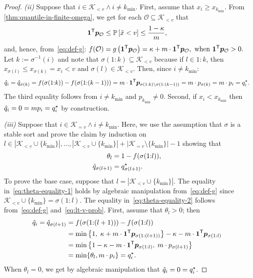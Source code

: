 \begin{proof}
\emph{(ii)} Suppose that $i \in \mathcal{K}_{<v} \wedge i \neq k_{\min}$. First, assume that $x_i \ge x_{k_{\min}}$. From \cref{thm:quantile-in-finite-omega}, we get for each $\mathcal{O} \subseteq \mathcal{K}_{<v}$ that
\begin{equation} \label{eq:lt-v-prob}
 \bm{1}^{\mathsf{T}} \bm{p}_{\mathcal{O}} \le \mathbb{P}\left[ \tilde{x} < v \right] \le \frac{1-\kappa}{m},
\end{equation}
and, hence, from~\eqref{eq:def-g}:
\(  f(\mathcal{O}) = g\left(\bm{1}^{\mathsf{T}} \bm{p}_{\mathcal{O}}\right) = \kappa + m \cdot \bm{1}^{\mathsf{T}} \bm{p}_{\mathcal{O}},
  \text{ when }
  \bm{1}^{\mathsf{T}} \bm{p}_{\mathcal{O}} > 0.
\) 
Let $k := \sigma^{-1}(i)$ and note that $ \sigma(1{:}k) \subseteq \mathcal{K}_{< v} $ because if $l \in 1{:}k$, then $x_{\sigma(l)} \le x_{\sigma(k)} = x_i < v$ and $\sigma(l) \in \mathcal{K}_{< v}$. Then, since $i \neq k_{\min}$:
\[
 \hat{q}_i = \hat{q}_{\sigma(k)} = f(\sigma(1{:}k)) - f(\sigma(1{:}(k-1)))
= m \cdot \bm{1}^{\mathsf{T}} \bm{p}_{\sigma(1{:}k) \setminus \sigma(1{:}(k-1)) } = m\cdot p_{\sigma(k)} = m\cdot p_i = q^{\star}_i. 
\]
The third equality follows from $i \neq k_{\min}$ and $p_{k_{\min}} \neq  0$. Second, if $x_i < x_{k_{\min}}$  then $\hat{q}_i = 0 = m p_i = q^{\star}_i$ by construction. 

\emph{(iii)} Suppose that $i \in \mathcal{K}_{=v} \wedge i \neq k_{\min}$. Here, we use the assumption that $\sigma$ is a stable sort and prove the claim by induction on $l \in |\mathcal{K}_{<v} \cup \{k_{\min}\}|, \dots, |\mathcal{K}_{<v}\cup \{k_{\min}\}| + |\mathcal{K}_{=v} \setminus \{ k_{\min}\}| - 1$ showing that
\begin{align}
 \label{eq:theta-equality-1}
  \theta_l &= 1 - f(\sigma(1{:}l)),  \\
  \label{eq:theta-equality-2}
    \hat{q}_{\sigma(l+1)} &= q^{\star}_{\sigma(l+1)}.
\end{align}
To prove the base case, suppose that $l = |\mathcal{K}_{<v} \cup \{k_{\min}\}|$. The equality in~\eqref{eq:theta-equality-1} holds by algebraic manipulation from~\eqref{eq:def-g} since $\mathcal{K}_{<v} \cup \{ k_{\min} \} = \sigma(1{:}l)$. The equality in~\eqref{eq:theta-equality-2} follows from~\eqref{eq:def-g} and~\eqref{eq:lt-v-prob}. First, assume that $\theta_l > 0$; then
\begin{equation} \label{eq:q-q-eq}
  \begin{aligned}
\hat{q}_{i} = \hat{q}_{\sigma(l+1)}  
  &= f ( \sigma(1{:}(l+1) )) - f ( \sigma(1{:}l) ) \\
  &= \min \left\{  1,\; \kappa + m \cdot \bm{1}^{\mathsf{T}} \bm{p}_{\sigma(1{:}(l+1))} \right\} - \kappa - m \cdot \bm{1}^{\mathsf{T}} \bm{p}_{\sigma(1{:}l)} \\
  &= \min \left\{1  - \kappa - m \cdot \bm{1}^{\mathsf{T}} \bm{p}_{\sigma(1{:}l)}, \; m \cdot p_{\sigma(l+1)}\right\} \\
  &= \min \{ \theta_l, m \cdot p_i \} = q_i^{\star}.
  \end{aligned}
\end{equation}
When $\theta_l = 0$, we get by algebraic manipulation that $\hat{q}_i = 0 = q^{\star}_i$.


\end{proof}
